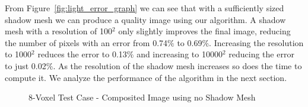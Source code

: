 From Figure~\ref{fig:light_error_graph} we can see that with a sufficiently
sized shadow mesh we can produce a quality image using our algorithm.  A shadow
mesh with a resolution of 100$^2$ only slightly improves the final image,
reducing the number of pixels with an error from 0.74$\%$ to 0.69$\%$. 
Increasing the resolution to 1000$^2$ reduces the error to 0.13$\%$ and
increasing to 10000$^2$ reducing the error to just 0.02$\%$.  As the
resolution of the shadow mesh increases so does the time to compute it.  We
analyze the performance of the algorithm in the next section. 

\begin{figure}
\setlength\tabcolsep{0pt}
\noindent{}
\caption{8-Voxel Test Case - Composited Image using no Shadow
Mesh}
\label{fig:san-miguel-8-composite-0}
\end{figure}

